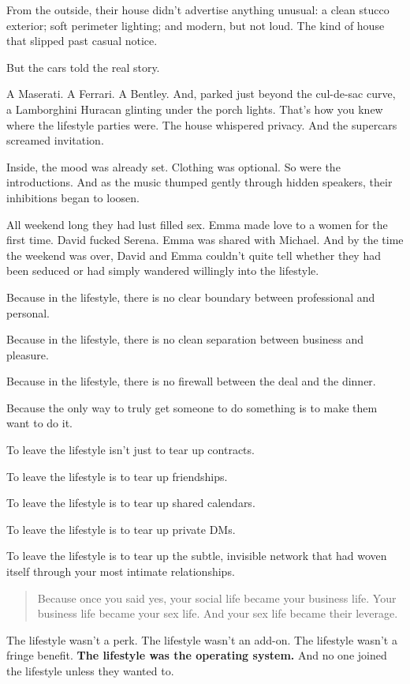 From the outside, their house didn’t advertise anything unusual: a clean stucco exterior; soft perimeter lighting; and modern, 
but not loud. The kind of house that slipped past casual notice.

But the cars told the real story.

A Maserati. A Ferrari. A Bentley. And, parked just beyond the cul-de-sac curve, a Lamborghini Huracan glinting under the porch 
lights.
That’s how you knew where the lifestyle parties were. The house whispered privacy. And the supercars screamed invitation.

Inside, the mood was already set. Clothing was optional. So were the introductions.
And as the music thumped gently through hidden speakers, their inhibitions began to loosen.

All weekend long they had lust filled sex.  Emma made love to a women for the first time.  David 
fucked Serena.  Emma was shared with Michael.  And by the time the weekend was over, David and 
Emma couldn’t quite tell whether they had been seduced or had simply wandered willingly into the lifestyle.


Because in the lifestyle, there is no clear boundary between professional and personal.  

Because in the lifestyle, there is no clean separation between business and pleasure.  

Because in the lifestyle, there is no firewall between the deal and the dinner.

Because the only way to truly get someone to do something is to make them want to do it.

To leave the lifestyle isn’t just to tear up contracts.

To leave the lifestyle is to tear up friendships.  

To leave the lifestyle is to tear up shared calendars.  

To leave the lifestyle is to tear up private DMs.  

To leave the lifestyle is to tear up the subtle, invisible network that had woven itself through your 
most intimate relationships.

\begin{quote}
Because once you said yes,  
your social life became your business life.  
Your business life became your sex life.  
And your sex life became their leverage.
\end{quote}

The lifestyle wasn’t a perk.
The lifestyle wasn’t an add-on.
The lifestyle wasn’t a fringe benefit.
\textbf{The lifestyle was the operating system.}
And no one joined the lifestyle unless they wanted to.

